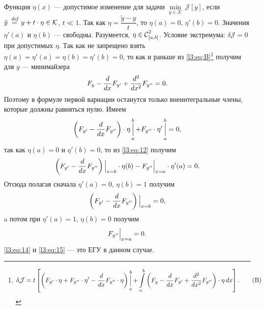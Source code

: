 \documentclass[12pt,a4paper,openany,fleqn]{book}
\newcommand {\defeq}{\stackrel{\hspace{0.09 cm}de\!f}{=}}
\newcommand {\eqdef}{\defeq}
\newcommand{\Cf}{\ensuremath{\mathcal{C}}}
\newcommand{\J}{\ensuremath{\mathcal{J}}}
\newcommand{\mc}[1]{\ensuremath{\mathcal{#1}}}
\newcommand{\Cfn}[2][]{\ensuremath{\Cf{\mathstrut}^{#2}_{#1}}}
\newcommand{\der}[2]{\ensuremath{\frac{d#1}{d#2}}}
\newcommand{\dder}[2]{\ensuremath{\frac{d^2#1}{d#2^2}}}
\newcommand{\K}{\mc{K}}
\theoremstyle{definition}
\begin{document}
Функция $\eta(x)$ --- допустимое изменение для задачи $\min\limits_{y\in\K}\,\J[y]$, если $\tilde{y}\eqdef y+t\cdot\eta\in\K$, $t\ll1$. Так как $\eta=\dfrac{\tilde{y}-y}{t}$, то $\eta(a)=0$, $\eta'(b)=0$. Значения $\eta'(a)$ и $\eta(b)$ --- свободны. Разумеется, $\eta\in\Cfn[{[a,b]}]{2}$. Условие экстремума: $\delta\J=0$ при допустимых $\eta$. Так как не запрещено взять $\eta(a)=\eta'(a)=\eta(b)=\eta'(b)=0$, то как и раньше из \eqref{l3:eq:B}\footnote{\begin{equation*}
	\hfill\delta\J=t\left[\left(F_{y'}\cdot\eta+F_{y''}\cdot\eta'-\der{}{x}F_{y''}\cdot\eta\right)\mathop{\Big|}\limits_a^b+\int\limits_a^b\left(F_{y}-\der{}{x}F_{y'}+\dder{}{x}F_{y''}\right)\cdot\eta\,dx\right].\hfill\tag{B}
\end{equation*}} получим для $y$ --- минимайзера
\begin{equation*}
	\hfill F_y-\der{}{x}F_{y'}+\dder{}{x}F_{y''}=0.\hfill
\end{equation*}
Поэтому в формуле первой вариации останутся только внеинтегральные члены, которые должны равняться нулю. Имеем
\begin{equation}
	\label{l3:eq:12}
	\hfill\left(F_{y'}-\der{}{x}F_{y''}\right)\cdot\eta\mathop{\Big|}\limits_a^b+F_{y''}\cdot\eta'\mathop{\Big|}\limits_a^b=0,\hfill
\end{equation}
так как $\eta(a)=0$ и $\eta'(b)=0$, то из \eqref{l3:eq:12} получим
\begin{equation}
	\label{l3:eq:13}
	\hfill\left(F_{y'}-\der{}{x}F_{y''}\right)\Big|_{x=b}\cdot\eta(b)-F_{y''}\Big|_{x=a}\cdot\eta'(a)=0.\hfill
\end{equation}
Отсюда полагая сначала $\eta'(a)=0$, $\eta(b)=1$ получим
\begin{equation}
	\label{l3:eq:14}
	\hfill\left(F_{y'}-\der{}{x}F_{y''}\right)\Big|_{x=b}=0,\hfill
\end{equation}
a потом при $\eta'(a)=1$, $\eta(b)=0$ получим 
\begin{equation}
	\label{l3:eq:15}
	\hfill F_{y''}\Big|_{x=a}=0.\hfill
\end{equation}
\eqref{l3:eq:14} и \eqref{l3:eq:15} --- это ЕГУ в данном случае.
\end{document}
